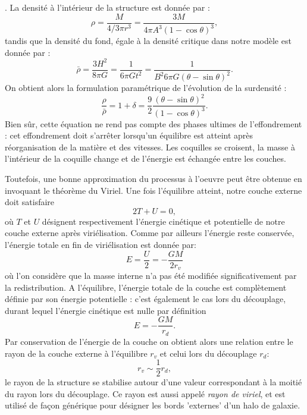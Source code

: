 . La densité à l'intérieur de la structure est donnée par :
\begin{equation}
\rho = \frac{M}{4/3 \pi r^3}=\frac{3M}{4\pi A^3(1-\cos \theta)^3}, 
\end{equation}
tandis que la densité du fond, égale à la densité critique dans notre modèle est donnée par :
\begin{equation}
\bar \rho =\frac{3H^2}{8\pi G}=\frac{1}{6\pi G t^2}=\frac{1}{B^2 6\pi G (\theta-\sin \theta)^2}.
\end{equation}
On obtient alors la formulation paramétrique de l'évolution de la surdensité :
\begin{equation}
\frac{\rho}{\bar \rho}=1+\delta=\frac{9}{2}\frac{(\theta - \sin \theta)^2}{(1-\cos \theta)^3}.
\label{e:dcoll}
\end{equation}
Bien sûr, cette équation ne rend pas compte des phases ultimes de l'effondrement : cet effondrement doit s'arrêter lorsqu'un équilibre est atteint après réorganisation de la matière et des vitesses. Les coquilles se croisent, la masse à l'intérieur de la coquille change et de l'énergie est échangée entre les couches.  

Toutefois, une bonne approximation du processus à l'oeuvre peut être obtenue en invoquant le théorème du Viriel. Une fois l'équilibre atteint, notre couche externe doit satisfaire
\begin{equation}
2 T +U = 0,
\end{equation}
où $T$ et $U$ désignent respectivement l'énergie cinétique et potentielle de notre couche externe après viriélisation. Comme par ailleurs l'énergie reste conservée, l'énergie totale en fin de viriélisation est donnée par:
\begin{equation}
E=\frac{U}{2}=-\frac{GM}{2r_v}
\end{equation}
où l'on considère que la masse interne n'a pas été modifiée significativement par la redistribution. A l'équilibre, l'énergie totale de la couche est complètement définie par son énergie potentielle : c'est également le cas lors du découplage, durant lequel l'énergie cinétique est nulle par définition
\begin{equation}
E=-\frac{GM}{r_d}.
\end{equation}
Par conservation de l'énergie de la couche on obtient alors une relation entre le rayon de la couche externe à l'équilibre $r_v$ et celui lors du découplage $r_d$:
\begin{equation}
r_v\sim \frac{1}{2}r_d,
\end{equation}
le rayon de la structure se stabilise autour d'une valeur correspondant à la moitié du rayon lors du découplage. Ce rayon est aussi appelé \textit{rayon de viriel}, et est utilisé de façon générique pour désigner les bords 'externes' d'un halo de galaxie.

